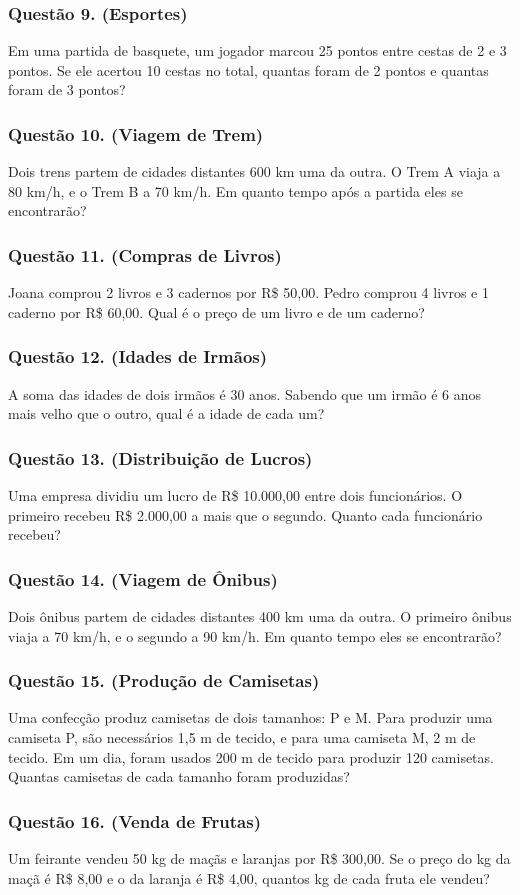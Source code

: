\documentclass[12pt]{beamer}
\begin{document}
\begin{frame}
\frametitle{Questão 9. (Esportes)}
Em uma partida de basquete, um jogador marcou 25 pontos entre cestas de 2 e 3 pontos. Se ele acertou 10 cestas no total, quantas foram de 2 pontos e quantas foram de 3 pontos?
\end{frame}

\begin{frame}
\frametitle{Questão 10. (Viagem de Trem)}
Dois trens partem de cidades distantes 600 km uma da outra. O Trem A viaja a 80 km/h, e o Trem B a 70 km/h. Em quanto tempo após a partida eles se encontrarão?
\end{frame}

\begin{frame}
\frametitle{Questão 11. (Compras de Livros)}
Joana comprou 2 livros e 3 cadernos por R\$ 50,00. Pedro comprou 4 livros e 1 caderno por R\$ 60,00. Qual é o preço de um livro e de um caderno?
\end{frame}

\begin{frame}
\frametitle{Questão 12. (Idades de Irmãos)}
A soma das idades de dois irmãos é 30 anos. Sabendo que um irmão é 6 anos mais velho que o outro, qual é a idade de cada um?
\end{frame}

\begin{frame}
\frametitle{Questão 13. (Distribuição de Lucros)}
Uma empresa dividiu um lucro de R\$ 10.000,00 entre dois funcionários. O primeiro recebeu R\$ 2.000,00 a mais que o segundo. Quanto cada funcionário recebeu?
\end{frame}

\begin{frame}
\frametitle{Questão 14. (Viagem de Ônibus)}
Dois ônibus partem de cidades distantes 400 km uma da outra. O primeiro ônibus viaja a 70 km/h, e o segundo a 90 km/h. Em quanto tempo eles se encontrarão?
\end{frame}

\begin{frame}
\frametitle{Questão 15. (Produção de Camisetas)}
Uma confecção produz camisetas de dois tamanhos: P e M. Para produzir uma camiseta P, são necessários 1,5 m de tecido, e para uma camiseta M, 2 m de tecido. Em um dia, foram usados 200 m de tecido para produzir 120 camisetas. Quantas camisetas de cada tamanho foram produzidas?
\end{frame}

\begin{frame}
\frametitle{Questão 16. (Venda de Frutas)}
Um feirante vendeu 50 kg de maçãs e laranjas por R\$ 300,00. Se o preço do kg da maçã é R\$ 8,00 e o da laranja é R\$ 4,00, quantos kg de cada fruta ele vendeu?
\end{frame}
\end{document}
